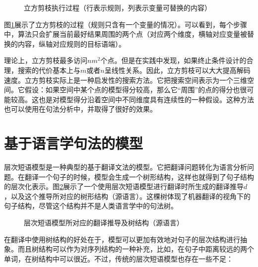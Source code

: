 \begin{figure}[htp]
\centering

\setlength{\abovecaptionskip}{-0.5em}
\caption{立方剪枝执行过程（行表示规则，列表示变量可替换的内容）}
\label{fig:8-13}
\end{figure}

\parinterval 图\ref{fig:8-13}展示了立方剪枝的过程（规则只含有一个变量的情况）。可以看到，每个步骤中，算法只会扩展当前最好结果周围的两个点（对应两个维度，横轴对应变量被替换的内容，纵轴对应规则的目标语端）。

\parinterval 理论上，立方剪枝最多访问$n{m}^2$个点。但是在实践中发现，如果终止条件设计的合理，搜索的代价基本上与$m$或者$n$呈线性关系。因此，立方剪枝可以大大提高解码速度。立方剪枝实际上是一种启发性的搜索方法。它把搜索空间表示为一个三维空间。它假设：如果空间中某个点的模型得分较高，那么它“周围”的点的得分也很可能较高。这也是对模型得分沿着空间中不同维度具有连续性的一种假设。这种方法也可以使用在句法分析中，并取得了很好的效果。


\sectionnewpage
\section{基于语言学句法的模型}\label{section-8.3}

\parinterval 层次短语模型是一种典型的基于翻译文法的模型。它把翻译问题转化为语言分析问题。在翻译一个句子的时候，模型会生成一个树形结构，这样也就得到了句子结构的层次化表示。图\ref{fig:8-14}展示了一个使用层次短语模型进行翻译时所生成的翻译推导$d$，以及这个推导所对应的树形结构（源语言）。这棵树体现了机器翻译的视角下的句子结构，尽管这个结构并不是人类语言学中的句法树。

\begin{figure}[htp]
\centering

\setlength{\belowcaptionskip}{-0.5em}
\caption{层次短语模型所对应的翻译推导及树结构（源语言）}
\label{fig:8-14}
\end{figure}

\parinterval 在翻译中使用树结构的好处在于，模型可以更加有效地对句子的层次结构进行抽象。而且树结构可以作为对序列结构的一种补充，比如，在句子中距离较远的两个单词，在树结构中可以很近。不过，传统的层次短语模型也存在一些不足：

